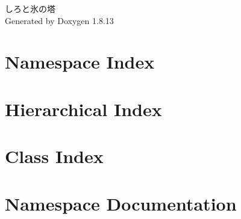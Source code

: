 \documentclass[twoside]{book}
\newcommand{\+}{\discretionary{\mbox{\scriptsize$\hookleftarrow$}}{}{}}
\newcommand{\clearemptydoublepage}{%
  \newpage{\pagestyle{empty}\cleardoublepage}%
}
\begin{document}
\hypersetup{pageanchor=false,
             bookmarksnumbered=true,
             pdfencoding=unicode
            }
\begin{titlepage}
\vspace*{7cm}
\begin{center}%
{\Large しろと氷の塔 }\\
\vspace*{1cm}
{\large Generated by Doxygen 1.8.13}\\
\end{center}
\end{titlepage}
\clearemptydoublepage
{}
\tableofcontents
\clearemptydoublepage
{}
\hypersetup{pageanchor=true}

\chapter{Namespace Index}

\chapter{Hierarchical Index}

\chapter{Class Index}

\chapter{Namespace Documentation}








\end{document}
